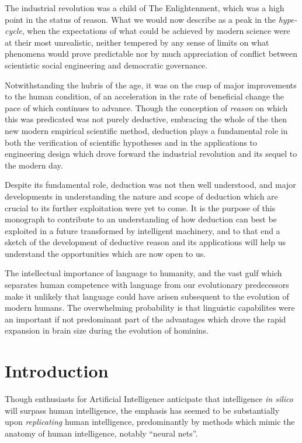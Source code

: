 \documentclass[10pt,titlepage]{book}
\begin{document}
The industrial revolution was a child of The Enlightenment, which was a high point in the status of reason.
What we would now describe as a peak in the \emph{hype-cycle}, when the expectations of what could be achieved by modern science were at their most unrealistic, neither tempered by any sense of limits on what phenomena would prove predictable nor by much appreciation of conflict between scientistic social engineering and democratic governance.

Notwithstanding the hubris of the age, it was on the cusp of major improvements to the human condition, of an acceleration in the rate of beneficial change the pace of which continues to advance.
Though the conception of \emph{reason} on which this was predicated was not purely deductive, embracing the whole of the then new modern empirical scientific method, deduction plays a fundamental role in both the verification of scientific hypotheses and in the applications to engineering design which drove forward the industrial revolution and its sequel to the modern day.

Despite its fundamental role, deduction was not then well understood, and major developments in understanding the nature and scope of deduction which are crucial to its further exploitation were yet to come.
It is the purpose of this monograph to contribute to an understanding of how deduction can best be exploited in a future transformed by intelligent machinery, and to that end a sketch of the development of deductive reason and its applications will help us understand the opportunities which are now open to us.

The intellectual importance of language to humanity, and the vast gulf which separates human competence with language from our evolutionary predecessors make it unlikely that language could have arisen subsequent to the evolution of modern humans.
The overwhelming probability is that linguistic capabilites were an important if not predominant part of the advantages which drove the rapid expansion in brain size during the evolution of hominins.



\chapter{Introduction}

Though enthusiasts for Artificial Intelligence anticipate that intelligence \emph{in silico} will surpass human intelligence, the emphasis has seemed to be substantially upon \emph{replicating} human intelligence, predominantly by methods which mimic the anatomy of human intelligence, notably ``neural nets''.
\end{document}
